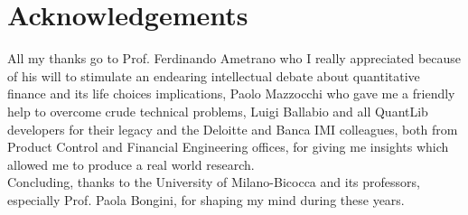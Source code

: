 \chapter*{Acknowledgements}

All my thanks go to Prof. Ferdinando Ametrano who I really appreciated because of his will to stimulate an endearing intellectual debate about quantitative finance and its life choices implications, Paolo Mazzocchi who gave me a friendly help to overcome crude technical problems, Luigi Ballabio and all QuantLib developers for their legacy and the Deloitte and Banca IMI colleagues, both from Product Control and Financial Engineering offices, for giving me insights which allowed me to produce a real world research.\\
Concluding, thanks to the University of Milano-Bicocca and its professors, especially Prof. Paola Bongini, for shaping my mind during these years.